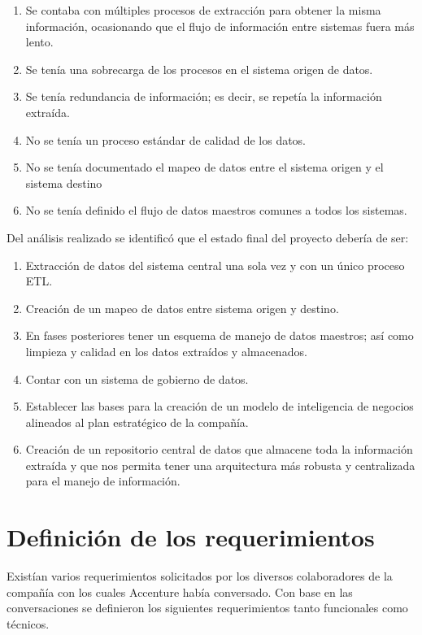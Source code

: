 \begin{enumerate}
\item Se contaba con múltiples procesos de extracción para obtener la misma
  información, ocasionando que el flujo de información entre sistemas fuera más
  lento.
\item Se tenía una sobrecarga de los procesos en el sistema origen de datos.
\item Se tenía redundancia de información; es decir, se repetía la información
  extraída.
\item No se tenía un proceso estándar de calidad de los datos.
\item No se tenía documentado el mapeo de datos entre el sistema origen y el
  sistema destino
\item No se tenía definido el flujo de datos maestros comunes a todos los sistemas.
\end{enumerate}

Del análisis realizado se identificó que el estado final del proyecto debería de
ser:

\begin{enumerate}
\item Extracción de datos del sistema central una sola vez y con un único
  proceso ETL.
\item Creación de un mapeo de datos entre sistema origen y destino.
\item En fases posteriores tener un esquema de manejo de datos maestros; así
  como limpieza y calidad en los datos extraídos y almacenados.
\item Contar con un sistema de gobierno de datos.
\item Establecer las bases para la creación de un modelo de inteligencia de
  negocios alineados al plan estratégico de la compañía.
\item Creación de un repositorio central de datos que almacene toda la
  información extraída y que nos permita tener una arquitectura más robusta y
  centralizada para el manejo de información.
\end{enumerate}

\section{Definición de los requerimientos}

Existían varios requerimientos solicitados por los diversos colaboradores de la
compañía con los cuales Accenture había conversado. Con base en las
conversaciones se definieron los siguientes requerimientos tanto funcionales
como técnicos.

